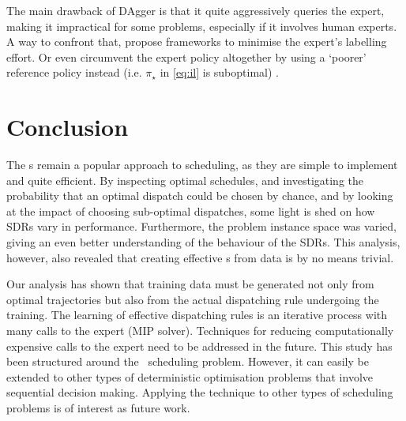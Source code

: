 \documentclass[twocolumn]{svjour3}
\begin{document}

The main drawback of DAgger is that it quite aggressively queries the expert, 
making it impractical for some problems, especially if it involves human 
experts. A way to confront that, \cite{Kim13,Judah12} propose frameworks to 
minimise the expert's labelling effort.
Or even circumvent the expert policy altogether by using a `poorer' reference 
policy instead (i.e. $\pi_\star$ in \cref{eq:il} is suboptimal) 
\cite{ChangKADL15}.


\section{Conclusion}\label{sec:con}

The \sdr s remain a popular approach to scheduling, as they are simple to implement and quite efficient. By inspecting optimal schedules, and investigating the probability that an optimal dispatch could be chosen by chance, and by looking at the impact of choosing sub-optimal dispatches,  some light is shed on how SDRs vary in performance. Furthermore, the problem instance space was varied, giving an even better understanding of the behaviour of the SDRs. This analysis, however, also revealed that creating effective \dr s from data is by no means trivial. 

Our analysis has shown that training data must be generated not only from optimal trajectories but also from the actual dispatching rule undergoing the training. The learning of effective dispatching rules is an iterative process with many calls to the expert (MIP solver). Techniques for reducing computationally expensive calls to the expert need to be addressed in the future. This study has been structured around the \jsp\ scheduling problem. However, it can easily be extended to other types of deterministic optimisation problems that involve sequential decision making. Applying the technique to other types of
scheduling problems is of interest as future work.


 
 
\end{document}

